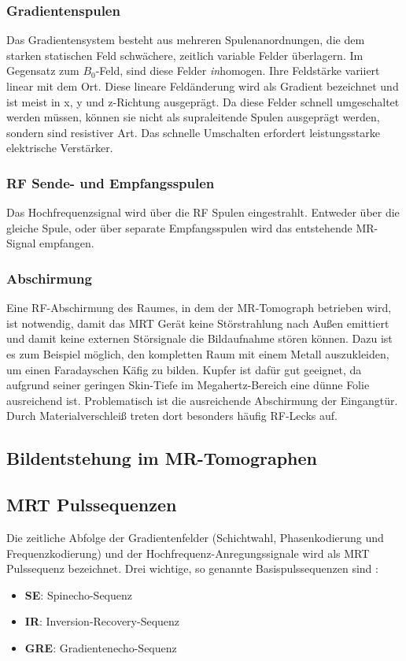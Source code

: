 \subsubsection{Gradientenspulen}
Das Gradientensystem besteht aus mehreren Spulenanordnungen, die dem starken statischen Feld schwächere, zeitlich variable Felder überlagern. Im Gegensatz zum $B_0$-Feld, sind diese Felder \textit{in}homogen. Ihre Feldstärke variiert linear mit dem Ort. Diese lineare Feldänderung wird als Gradient bezeichnet und ist meist in x, y und z-Richtung ausgeprägt. Da diese Felder schnell umgeschaltet werden müssen, können sie nicht als supraleitende Spulen ausgeprägt werden, sondern sind resistiver Art. Das schnelle Umschalten erfordert leistungsstarke elektrische Verstärker.


\subsubsection{RF Sende- und Empfangsspulen}
Das Hochfrequenzsignal wird über die RF Spulen eingestrahlt. Entweder über die gleiche Spule, oder über separate Empfangsspulen wird das entstehende MR-Signal empfangen.

\subsubsection{Abschirmung}
Eine RF-Abschirmung des Raumes, in dem der MR-Tomograph betrieben wird, ist notwendig, damit das MRT Gerät keine Störstrahlung nach Außen emittiert und damit keine externen Störsignale die Bildaufnahme stören können.
Dazu ist es zum Beispiel möglich, den kompletten Raum mit einem Metall auszukleiden, um einen Faradayschen Käfig zu bilden. Kupfer ist dafür gut geeignet, da aufgrund seiner geringen Skin-Tiefe im Megahertz-Bereich eine dünne Folie ausreichend ist. \cite{Weibler1993} Problematisch ist die ausreichende Abschirmung der Eingangtür. Durch Materialverschleiß treten dort besonders häufig RF-Lecks auf.


\subsection{Bildentstehung im MR-Tomographen}

\subsection{MRT Pulssequenzen}
Die zeitliche Abfolge der Gradientenfelder (Schichtwahl, Phasenkodierung und Frequenzkodierung) und der Hochfrequenz-Anregungssignale wird als MRT Pulssequenz bezeichnet.
Drei wichtige, so genannte Basispulssequenzen sind \cite[S. 999]{Weishaupt2014}:
\begin{itemize}
	\item \textbf{SE}: Spinecho-Sequenz
	\item \textbf{IR}: Inversion-Recovery-Sequenz
	\item \textbf{GRE}: Gradientenecho-Sequenz
\end{itemize}

